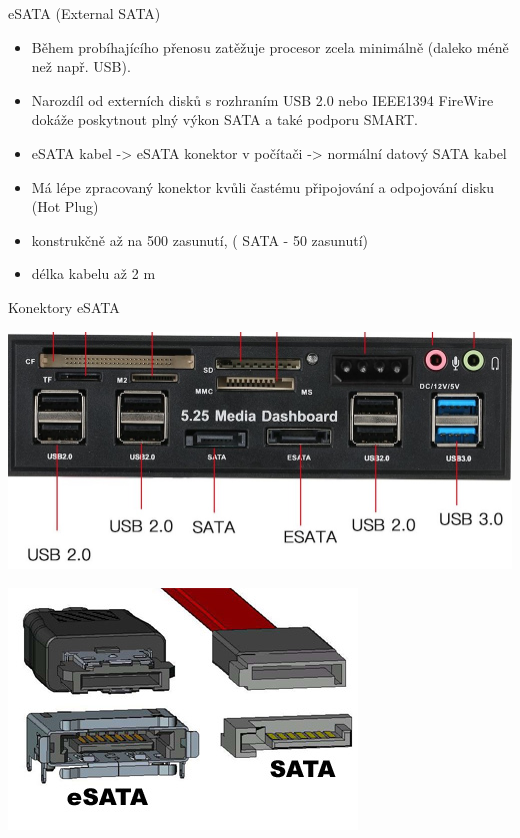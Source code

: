 \documentclass[aspectratio=43]{beamer}
\begin{document}
\begin{frame}{eSATA (External SATA)}
	\begin{itemize}
		\item Během probíhajícího přenosu zatěžuje procesor zcela minimálně (daleko méně než např. USB). 
		\item Narozdíl od externích disků s rozhraním USB 2.0 nebo IEEE1394 FireWire dokáže poskytnout plný výkon SATA a také podporu SMART.
		\item eSATA kabel -> eSATA konektor v počítači -> normální datový SATA kabel
		\item Má lépe zpracovaný konektor kvůli častému připojování a odpojování disku (Hot Plug) 
		\item konstrukčně až na 500 zasunutí, ( SATA - 50 zasunutí)
		\item délka kabelu až 2 m
	\end{itemize}
\end{frame}


\begin{frame}{Konektory eSATA}
\begin{center}
			\includegraphics[width=0.6\linewidth]{extrahovane_obrazky/esata.jpg}
		\end{center}
        \begin{center}
			\includegraphics[width=0.5\linewidth]{extrahovane_obrazky/sata_esata.jpeg}
		\end{center}
	
\end{frame}
\end{document}
